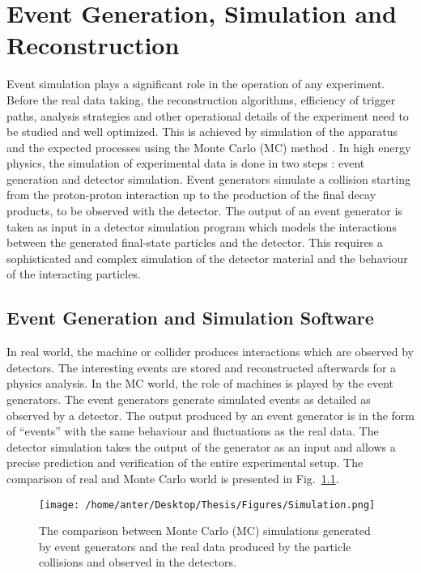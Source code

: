 \chapter{Event Generation, Simulation and Reconstruction}
\label{chap:Reconstruction}
Event simulation plays a significant role in the operation of any experiment. Before the real data taking, the reconstruction algorithms, efficiency of trigger paths, analysis strategies and other operational details of the experiment need to be studied and well optimized. This is achieved by simulation of the apparatus and the expected processes using the Monte Carlo (MC) method \cite{Monte}. In high energy physics, the simulation of experimental data is done in two steps : event generation and detector simulation. Event generators simulate a collision starting from the proton-proton interaction up to the production of the final decay products, to be observed with the detector. The output of an event generator is taken as input in a detector simulation program which models the interactions between the generated final-state particles and the detector. This requires a sophisticated and complex simulation of the detector material and the behaviour of the interacting particles.

\section{Event Generation and Simulation Software}
In real world, the machine or collider produces interactions which are observed by detectors. The interesting events are stored and reconstructed afterwards for a physics analysis. In the MC world, the role of machines is played by the event generators. The event generators generate simulated events as detailed as observed by a detector. The output produced by an event generator is in the form of ``events'' with the same behaviour and fluctuations as the real data. The detector simulation takes the output of the generator as an input and allows a precise prediction and verification of the entire experimental setup. The comparison of real and Monte Carlo world is presented in Fig.~\ref{fig:sim}. %

\begin{figure}[h!]
\begin{center}
\vspace*{2mm} 
\texttt{[image: /home/anter/Desktop/Thesis/Figures/Simulation.png]}\\
\vspace*{4mm} 
\caption{The comparison between Monte Carlo (MC) simulations generated by event generators and the real data produced by the particle collisions and observed in the detectors.}
\label{fig:sim}
\end{center}
\end{figure}

